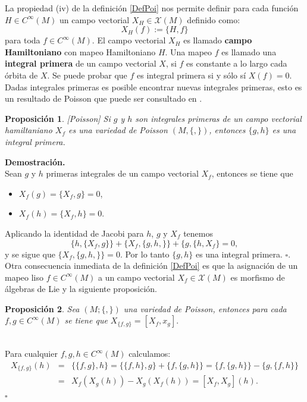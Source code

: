 \documentclass[a4paper,10pt]{book}
\newtheorem{propo}{Proposici\'on}[chapter]
\begin{document}
La propiedad (iv) de la definici\'on \ref{DefPoi} nos permite definir para cada funci\'on $H\in C^{\infty}(M)$ un campo vectorial $X_{H}\in\mathcal{X}(M)$ definido como: 
\begin{equation}\label{DefHam}
X_{H}(f):=\{H,f\}
\end{equation} 
para toda $f\in C^{\infty}(M)$. El campo vectorial $X_{H}$ es llamado {\bfseries campo Hamiltoniano} con mapeo Hamiltoniano $H$. Una mapeo $f$ es llamado una {\bfseries integral primera} de un campo vectorial $X$, si $f$ es constante a lo largo cada \'orbita de $X$. Se puede probar que $f$ es integral primera si y s\'olo s\'i $X(f)=0$.\\   

Dadas integrales primeras es posible encontrar nuevas integrales primeras, esto es un resultado de Poisson que puede ser consultado en \cite{Poisson}.  

\begin{propo}\label{PropoPoisson}[Poisson]
Si $g$ y $h$ son integrales primeras de un campo vectorial hamiltaniano  $X_{f}$ es una variedad de Poisson $(M, \{,\})$, entonces $\{g, h\}$ es una integral primera.
\end{propo}
{\bfseries Demostraci\'on.}\\
Sean $g$ y $h$ primeras integrales de un campo vectorial $X_{f}$, entonces se tiene que 
\begin{itemize}
    \item $X_{f}(g)=\{X_{f},g\}=0$,
    \item $X_{f}(h)=\{X_{f},h\}=0.$
\end{itemize}
Aplicando la identidad de Jacobi para $h$, $g$ y $X_{f}$ tenemos 
$$\{h,\{X_{f},g\}\}+\{X_{f},\{g,h,\}\}+\{g,\{h,X_{f}\}=0,$$
y se sigue que $\{X_{f},\{g,h,\}\}=0$. Por lo tanto $\{g,h\}$ es una integral primera. \hfill $\square.$\\

Otra consecuencia inmediata de la definici\'on \ref{DefPoi} es que la asignaci\'on de un mapeo liso $f\in C^{\infty}(M)$ a un campo vectorial $X_{f}\in\mathcal{X}(M)$ es morfismo de \'algebras de Lie y la siguiente proposici\'on.

\begin{propo}\label{propoHamilto}
Sea $(M;\{,\})$ una variedad de Poisson, entonces para cada $f,g\in C^{\infty}(M)$ se tiene que $X_{\{f,g\}}=[X_{f},x_{g}].$
\end{propo}
\\
Para cualquier $f,g,h\in C^{\infty}(M)$ calculamos:
\begin{eqnarray*}
X_{\{f,g\}}(h) & = & \{\{f,g\},h\} = \{\{f,h\},g\} + \{f,\{g,h\}\} = \{f,\{g,h\}\} - \{g,\{f,h\}\} \\
               & = & X_{f}(X_{g}(h)) - X_{g}(X_{f}(h)) = [X_{f},X_{g}](h).
\end{eqnarray*}
\hfill $\square$\\
\end{document}
